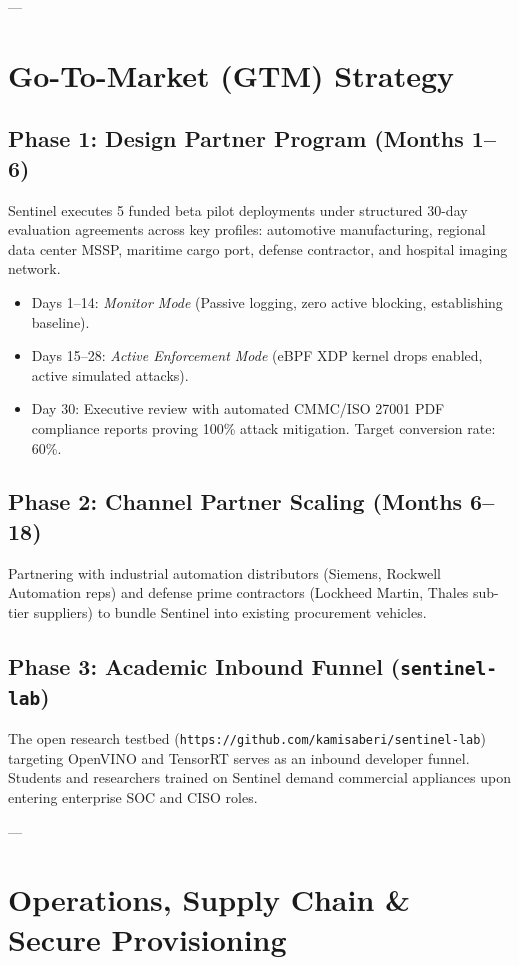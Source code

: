 \documentclass[11pt,a4paper]{article}
\begin{document}
---

\section{Go-To-Market (GTM) Strategy}

\subsection{Phase 1: Design Partner Program (Months 1--6)}
Sentinel executes 5 funded beta pilot deployments under structured 30-day evaluation agreements across key profiles: automotive manufacturing, regional data center MSSP, maritime cargo port, defense contractor, and hospital imaging network.
\begin{itemize}
    \item Days 1--14: \emph{Monitor Mode} (Passive logging, zero active blocking, establishing baseline).
    \item Days 15--28: \emph{Active Enforcement Mode} (eBPF XDP kernel drops enabled, active simulated attacks).
    \item Day 30: Executive review with automated CMMC/ISO 27001 PDF compliance reports proving 100\% attack mitigation. Target conversion rate: 60\%.
\end{itemize}

\subsection{Phase 2: Channel Partner Scaling (Months 6--18)}
Partnering with industrial automation distributors (Siemens, Rockwell Automation reps) and defense prime contractors (Lockheed Martin, Thales sub-tier suppliers) to bundle Sentinel into existing procurement vehicles.

\subsection{Phase 3: Academic Inbound Funnel (\texttt{sentinel-lab})}
The open research testbed (\texttt{https://github.com/kamisaberi/sentinel-lab}) targeting OpenVINO and TensorRT serves as an inbound developer funnel. Students and researchers trained on Sentinel demand commercial appliances upon entering enterprise SOC and CISO roles.

---

\section{Operations, Supply Chain \& Secure Provisioning}
\end{document}
